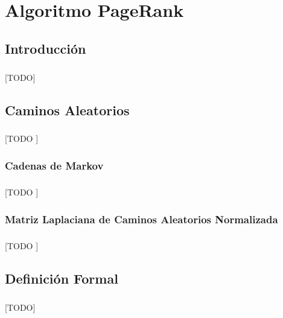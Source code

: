 \documentclass{subfiles}
\begin{document}
  \chapter{Algoritmo PageRank}
  \label{chap:graphs}

    \section{Introducción}
    \label{sec:pagerank_intro}

      \paragraph{}
      [TODO]

    \section{Caminos Aleatorios}
    \label{sec:random_walks}

      \paragraph{}
      [TODO ]

      \subsection{Cadenas de Markov}
      \label{sec:markov_chains}

        \paragraph{}
        [TODO ]

      \subsection{Matriz Laplaciana de Caminos Aleatorios Normalizada}
      \label{sec:random_walk_normalized_laplacian_matrix}

        \paragraph{}
        [TODO ]

    \section{Definición Formal}
    \label{sec:pagerank_formal_definition}

      \paragraph{}
      [TODO]
\end{document}

